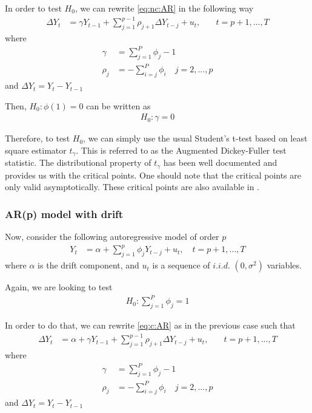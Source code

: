 \documentclass[]{article}\usepackage[]{graphicx}\usepackage[]{color}
\begin{document}
In order to test $H_0$, we can rewrite \ref{eq:nc:AR} in the following way
\begin{align}
	\Delta Y_t & = \gamma Y_{t-1} + \sum_{j=1}^{p-1}\rho_{j+1}\Delta Y_{t-j} + u_t, & \quad t = p + 1, ... , T
\end{align}
where
\begin{align}
	\gamma & =\sum_{j=1}^{P} \phi_{j} -1 \\
	\rho_j & = - \sum_{i=j}^{P} \phi_{i} \quad j = 2,...,p
\end{align}
and $\Delta Y_t= Y_{t}-Y_{t-1}$

Then, $H_0: \phi(1)=0$ can be written as
\begin{align}
	H_0: \gamma=0
\end{align}

Therefore, to test $H_0$, we can simply use the usual Student's t-test based on least square estimator $t_\gamma$. This is referred to as the Augmented Dickey-Fuller test statistic. The distributional property of $t_\gamma$ has been well documented and \cite[Table 8.5.2, $n=\infty$]{fuller_introduction_1976} provides us with the critical points. One should note that the critical points are only valid asymptotically. These critical points are also available in \cite{banerjee_co-integration_1993}.

\subsubsection{AR(p) model with drift}

Now, consider the following autoregressive model of order $p$
\begin{align}
	\label{eq:c:AR}
	Y_t & = \alpha + \sum_{j=1}^{p} \phi_j Y_{t-j} + u_t, \quad t = p + 1, ... , T
\end{align}
where $\alpha$ is the drift component, and $u_t$ is a sequence of $i.i.d.$ $(0,\sigma^2)$ variables.

Again, we are looking to test
\begin{align}
	H_0: \sum_{j=1}^{P} \phi_{j} = 1
\end{align}

In order to do that, we can rewrite \ref{eq:c:AR} as in the previous case such that
\begin{align}
	\Delta Y_t & =  \alpha + \gamma Y_{t-1} + \sum_{j=1}^{p-1}\rho_{j+1}\Delta Y_{t-j} + u_t, & \quad t = p + 1, ... , T
\end{align}
where
\begin{align}
	\gamma & =\sum_{j=1}^{P} \phi_{j} -1 \\
	\rho_j & = - \sum_{i=j}^{P} \phi_{i} \quad j = 2,...,p
\end{align}
and $\Delta Y_t= Y_{t}-Y_{t-1}$
\end{document}
